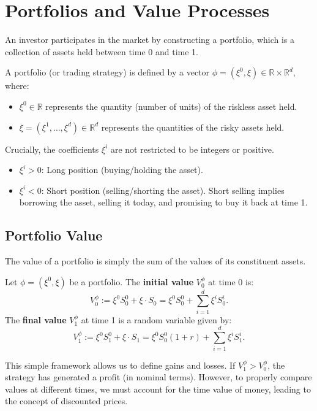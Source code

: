 \section{Portfolios and Value Processes}

An investor participates in the market by constructing a portfolio, which is a collection of assets held between time 0 and time 1.

\begin{definition}[Portfolio]
A portfolio (or trading strategy) is defined by a vector $\phi = (\xi^0, \xi) \in \mathbb{R} \times \mathbb{R}^d$, where:
\begin{itemize}
    \item $\xi^0 \in \mathbb{R}$ represents the quantity (number of units) of the riskless asset held.
    \item $\xi = (\xi^1, \dots, \xi^d) \in \mathbb{R}^d$ represents the quantities of the risky assets held.
\end{itemize}
\end{definition}

Crucially, the coefficients $\xi^i$ are not restricted to be integers or positive.
\begin{itemize}
    \item $\xi^i > 0$: Long position (buying/holding the asset).
    \item $\xi^i < 0$: Short position (selling/shorting the asset). Short selling implies borrowing the asset, selling it today, and promising to buy it back at time 1.
\end{itemize}

\subsection{Portfolio Value}

The value of a portfolio is simply the sum of the values of its constituent assets.

\begin{definition}
Let $\phi = (\xi^0, \xi)$ be a portfolio.
The \textbf{initial value} $V_0^\phi$ at time 0 is:
\begin{equation}
    V_0^\phi := \xi^0 S_0^0 + \xi \cdot S_0 = \xi^0 S_0^0 + \sum_{i=1}^d \xi^i S_0^i.
\end{equation}
The \textbf{final value} $V_1^\phi$ at time 1 is a random variable given by:
\begin{equation}
    V_1^\phi := \xi^0 S_1^0 + \xi \cdot S_1 = \xi^0 S_0^0(1+r) + \sum_{i=1}^d \xi^i S_1^i.
\end{equation}
\end{definition}

This simple framework allows us to define gains and losses. If $V_1^\phi > V_0^\phi$, the strategy has generated a profit (in nominal terms). However, to properly compare values at different times, we must account for the time value of money, leading to the concept of discounted prices.
